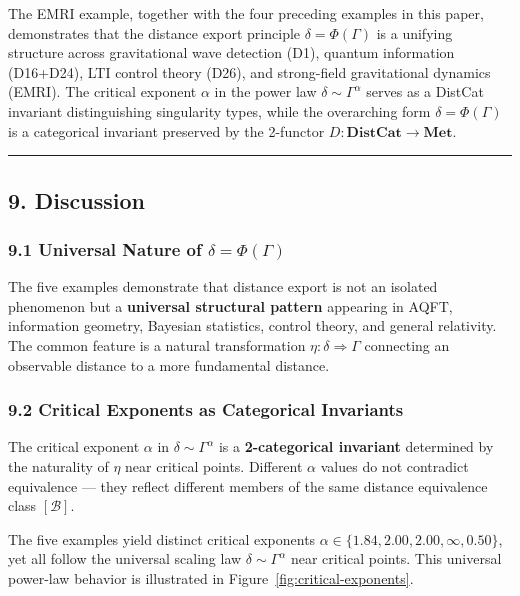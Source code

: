 \documentclass[
]{article}
\begin{document}
The EMRI example, together with the four preceding examples in this paper, demonstrates that the distance export principle $\delta = \Phi(\Gamma)$ is a unifying structure across gravitational wave detection (D1), quantum information (D16+D24), LTI control theory (D26), and strong-field gravitational dynamics (EMRI). The critical exponent $\alpha$ in the power law $\delta \sim \Gamma^\alpha$ serves as a DistCat invariant distinguishing singularity types, while the overarching form $\delta = \Phi(\Gamma)$ is a categorical invariant preserved by the 2-functor $D: \mathbf{DistCat} \to \mathbf{Met}$.

\begin{center}\rule{0.5\linewidth}{0.5pt}\end{center}


\subsection{9. Discussion}\label{discussion}

\subsubsection{\texorpdfstring{9.1 Universal Nature of
\(\delta = \Phi(\Gamma)\)}{9.1 Universal Nature of \textbackslash delta = \textbackslash Phi(\textbackslash Gamma)}}\label{universal-nature-of-delta-phigamma}

The five examples demonstrate that distance export is not an isolated
phenomenon but a \textbf{universal structural pattern} appearing in
AQFT, information geometry, Bayesian statistics, control theory, and
general relativity. The common feature is a natural transformation
\(\eta: \delta \Rightarrow \Gamma\) connecting an observable distance to
a more fundamental distance.

\subsubsection{9.2 Critical Exponents as Categorical
Invariants}\label{critical-exponents-as-categorical-invariants}

The critical exponent \(\alpha\) in \(\delta \sim \Gamma^\alpha\) is a
\textbf{2-categorical invariant} determined by the naturality of
\(\eta\) near critical points. Different \(\alpha\) values do not
contradict equivalence --- they reflect different members of the same
distance equivalence class \([\mathcal{B}]\).

The five examples yield distinct critical exponents \(\alpha \in \{1.84, 2.00, 2.00, \infty, 0.50\}\), yet all follow the universal scaling law \(\delta \sim \Gamma^\alpha\) near critical points. This universal power-law behavior is illustrated in Figure~\ref{fig:critical-exponents}.
\end{document}
